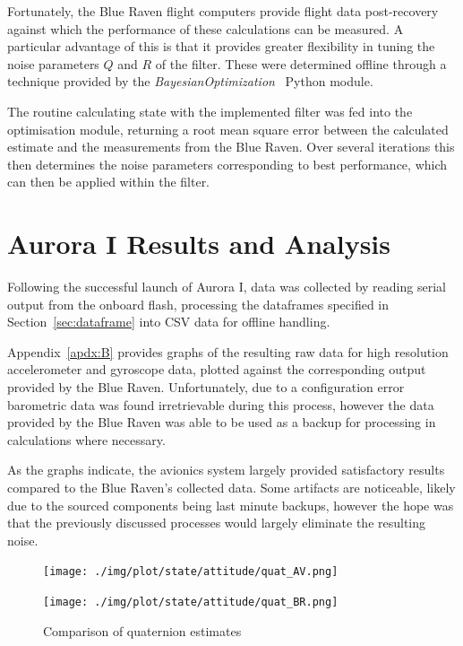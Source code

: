 Fortunately, the Blue Raven flight computers provide flight data post-recovery against which the performance of these calculations can be measured. A particular advantage of this is that it provides greater flexibility in tuning the noise parameters $Q$ and $R$ of the filter. These were determined offline through a technique provided by the \textit{BayesianOptimization}~\cite{Bayesian2014} Python module. 

The routine calculating state with the implemented filter was fed into the optimisation module, returning a root mean square error between the calculated estimate and the measurements from the Blue Raven. Over several iterations this then determines the noise parameters corresponding to best performance, which can then be applied within the filter.

\section{Aurora I Results and Analysis}
Following the successful launch of Aurora I, data was collected by reading serial output from the onboard flash, processing the dataframes specified in Section~\ref{sec:dataframe} into CSV data for offline handling. 

Appendix~\ref{apdx:B} provides graphs of the resulting raw data for high resolution accelerometer and gyroscope data, plotted against the corresponding output provided by the Blue Raven. Unfortunately, due to a configuration error barometric data was found irretrievable during this process, however the data provided by the Blue Raven was able to be used as a backup for processing in calculations where necessary.

As the graphs indicate, the avionics system largely provided satisfactory results compared to the Blue Raven's collected data. Some artifacts are noticeable, likely due to the sourced components being last minute backups, however the hope was that the previously discussed processes would largely eliminate the resulting noise. 

\begin{figure}[ht!]
  \begin{minipage}{0.5\textwidth}
    \texttt{[image: ./img/plot/state/attitude/quat\_AV.png]}
  \end{minipage}
  \begin{minipage}{0.5\textwidth}
    \texttt{[image: ./img/plot/state/attitude/quat\_BR.png]}
  \end{minipage}
\caption{Comparison of quaternion estimates}\label{fig:quat-estimates}
\end{figure}

